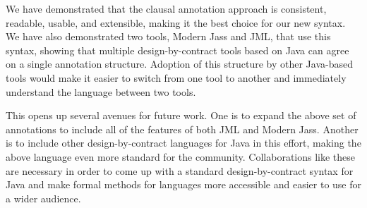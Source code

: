\documentclass{llncs}
\begin{document}
We have demonstrated that the clausal annotation approach is consistent, readable, usable, and extensible, making it the best choice for our new syntax.  We have also demonstrated two tools, Modern Jass and JML, that use this syntax, showing that multiple design-by-contract tools based on Java can agree on a single annotation structure.  Adoption of this structure by other Java-based tools would make it easier to switch from one tool to another and immediately understand the language between two tools.  

This opens up several avenues for future work.  One is to expand the above set of annotations to include all of the features of both JML and Modern Jass.  Another is to include other design-by-contract languages for Java in this effort, making the above language even more standard for the community.  Collaborations like these are necessary in order to come up with a standard design-by-contract syntax for Java and make formal methods for languages more accessible and easier to use for a wider audience.



\end{document}
